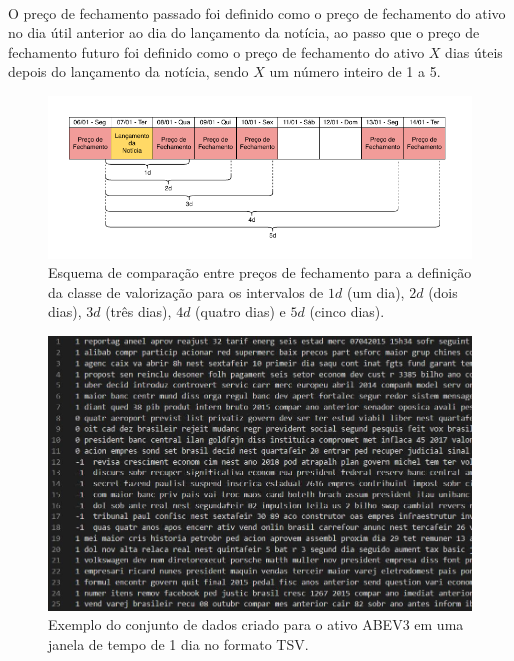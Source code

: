 \documentclass[grad,numbers]{coppe}
\begin{document}
  		\paragraph{}O preço de fechamento passado foi definido como o preço de fechamento do ativo no dia útil anterior ao dia do lançamento da notícia, ao passo que o preço de fechamento futuro foi definido como o preço de fechamento do ativo $X$ dias úteis depois do lançamento da notícia, sendo $X$ um número inteiro de 1 a 5.
  		\begin{figure}[h]
  			\centering
  			{\includegraphics[width=16cm]{calendar-example.pdf}
	 				\caption{Esquema de comparação entre preços de fechamento para a definição da classe de valorização para os intervalos de $1d$ (um dia), $2d$ (dois dias), $3d$ (três dias), $4d$ (quatro dias) e $5d$ (cinco dias).}
	 				\label{fig:calendar-example-fig}}
  		\end{figure}
  		\begin{figure}[h]
  			\centering
  			{\includegraphics[width=14cm]{abev3_dataset_example}
  				\caption{Exemplo do conjunto de dados criado para o ativo ABEV3 em uma janela de tempo de 1 dia no formato TSV.}
  				\label{fig:abev3_dataset_example-fig}}
  		\end{figure}
\end{document}
